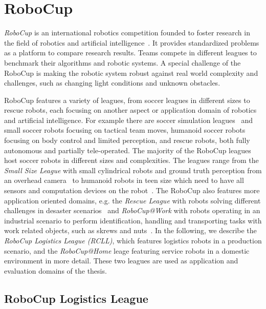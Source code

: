 \section{RoboCup}
\label{sec:robocup}
\emph{RoboCup} is an international robotics competition founded to
foster research in the field of robotics and artificial
intelligence~\cite{RoboCup-Paper,Gazsim-Thesis}. It provides
standardized problems as a platform to compare research results. Teams
compete in different leagues to benchmark their algorithms and robotic
systems. A special challenge of the RoboCup is making the robotic
system robust against real world complexity and challenges, such as
changing light conditions and unknown obstacles.

RoboCup features a variety of leagues, from soccer leagues in
different sizes to rescue robots, each focusing on another aspect or
application domain of robotics and artificial intelligence.  For
example there are soccer simulation leagues~\cite{simspark_old} and
small soccer robots focusing on tactical team moves, humanoid soccer
robots focusing on body control and limited perception, and rescue
robots, both fully autonomous and partially tele-operated. The
majority of the RoboCup leagues host soccer robots in different sizes
and complexities. The leagues range from the \emph{Small Size League}
with small cylindrical robots and ground truth perception from an
overhead camera~\cite{rc-ssl} to humanoid robots in teen size which
need to have all sensors and computation devices on the
robot~\cite{rc-book}. The RoboCup also features more application
oriented domains, e.g. the \emph{Rescue League} with robots solving
different challenges in desaster scenarios~\cite{rc-rescue} and
\emph{RoboCup@Work} with robots operating in an industrial scenario to
perform identification, handling and transporting tasks with work
related objects, such as skrews and nuts~\cite{rc-work}. In the
following, we describe the \emph{RoboCup Logistics League (RCLL)},
which features logistics robots in a production scenario, and the
\emph{RoboCup@Home} leage featuring service robots in a domestic
environment in more detail. These two leagues are used as application
and evaluation domains of the thesis.

\subsection{RoboCup Logistics League}

